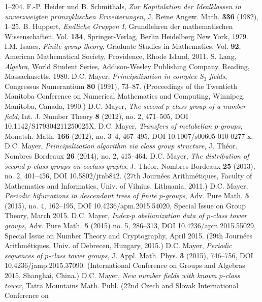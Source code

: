 \documentclass{amsart}
\theoremstyle{definition}
\numberwithin{equation}{section}
\begin{document}
\begin{thebibliography}{XX}
1--204.
F.-P. Heider und B. Schmithals,
\textit{Zur Kapitulation der Idealklassen
in unverzweigten primzyklischen Erweiterungen},
J. Reine Angew. Math.
\textbf{336}
(1982),
1--25.
B. Huppert,
\textit{Endliche Gruppen I},
Grundlehren der mathematischen Wissenschaften,
Vol. \textbf{134},
Springer-Verlag,
Berlin Heidelberg New York,
1979.
I.M. Isaacs,
\textit{Finite group theory},
Graduate Studies in Mathematics,
Vol. \textbf{92},
American Mathematical Society,
Providence, Rhode Island,
2011.
S. Lang,
\textit{Algebra},
World Student Series,
Addison-Wesley Publishing Company,
Reading, Massachusetts,
1980.
D.C. Mayer,
\textit{Principalization in complex \(S_3\)-fields},
Congressus Numerantium
\textbf{80}
(1991),
73--87.
(Proceedings of the Twentieth Manitoba Conference
on Numerical Mathematics and Computing,
Winnipeg, Manitoba, Canada, 1990.)
D.C. Mayer,
\textit{The second \(p\)-class group of a number field},
Int. J. Number Theory
\textbf{8}
(2012),
no. 2,
471--505,
DOI 10.1142/S179304211250025X.
D.C. Mayer,
\textit{Transfers of metabelian \(p\)-groups},
Monatsh. Math.
\textbf{166}
(2012),
no. 3--4,
467--495,
DOI 10.1007/s00605-010-0277-x.
D.C. Mayer,
\textit{Principalization algorithm via class group structure},
J. Th\'eor. Nombres Bordeaux
\textbf{26}
(2014),
no. 2,
415--464.
D.C. Mayer,
\textit{The distribution of second \(p\)-class groups on coclass graphs},
J. Th\'eor. Nombres Bordeaux
\textbf{25}
(2013),
no. 2,
401--456,
DOI 10.5802/jtnb842.
(27th Journ\'ees Arithm\'etiques,
Faculty of Mathematics and Informatics,
Univ. of Vilnius,
Lithuania,
2011.)
D.C. Mayer,
\textit{Periodic bifurcations in descendant trees of finite \(p\)-groups},
Adv. Pure Math.
\textbf{5}
(2015),
no. 4,
162--195,
DOI 10.4236/apm.2015.54020,
Special Issue on Group Theory,
March 2015.
D.C. Mayer,
\textit{Index-\(p\) abelianization data of \(p\)-class tower groups},
Adv. Pure Math.
\textbf{5}
(2015)
no. 5,
286--313,
DOI 10.4236/apm.2015.55029,
Special Issue on Number Theory and Cryptography,
April 2015.
(29th Journ\'ees Arithm\'etiques,
Univ. of Debrecen,
Hungary,
2015.)
D.C. Mayer,
\textit{Periodic sequences of \(p\)-class tower groups},
J. Appl. Math. Phys.
\textbf{3}
(2015),
746--756,
DOI 10.4236/jamp.2015.37090.
(International Conference on
Groups and Algebras \(2015\),
Shanghai, China.)
D.C. Mayer,
\textit{New number fields with known \(p\)-class tower},
Tatra Mountains Math. Publ.
(22nd Czech and Slovak International Conference on

\end{thebibliography}
\end{document}
